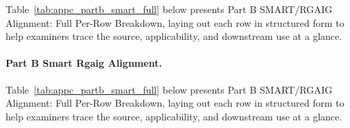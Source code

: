 {\tablestripes\tablefontsize

\noindent Table~\ref{tab:appc_partb_smart_full} below presents Part B SMART/RGAIG Alignment: Full Per-Row Breakdown, laying out each row in structured form to help examiners trace the source, applicability, and downstream use at a glance. %
\paragraph{Part B Smart Rgaig Alignment.} %
\noindent Table~\ref{tab:appc_partb_smart_full} below presents Part B SMART/RGAIG Alignment: Full Per-Row Breakdown, laying out each row in structured form to help examiners trace the source, applicability, and downstream use at a glance. %



}
